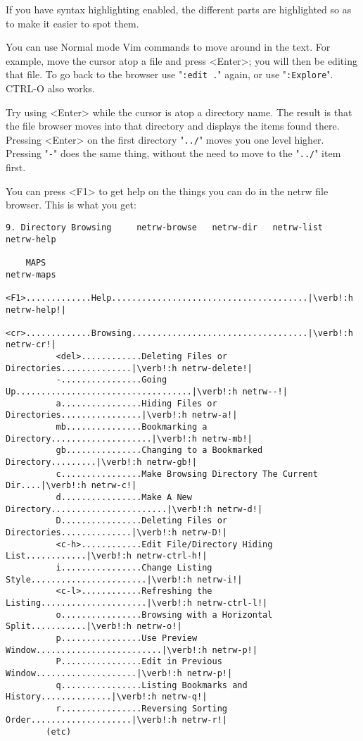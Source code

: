 If you have syntax highlighting enabled, the different parts are highlighted so as to make it easier to spot them.

You can use Normal mode Vim commands to move around in the text.
For example, move the cursor atop a file and press <Enter>; you will then be editing that file.
To go back to the browser use "\verb!:edit .!" again, or use "\verb!:Explore!".
CTRL-O also works.

Try using <Enter> while the cursor is atop a directory name.
The result is that the file browser moves into that directory and displays the items found there.
Pressing <Enter> on the first directory "\verb!../!" moves you one level higher.
Pressing "\verb!-!" does the same thing, without the need to move to the "\verb!../!" item first.

You can press <F1> to get help on the things you can do in the netrw file browser.
This is what you get:

\begin{Verbatim}[samepage=true]
    9. Directory Browsing     netrw-browse   netrw-dir   netrw-list   netrw-help 

    MAPS                                                                  netrw-maps 
          <F1>.............Help.......................................|\verb!:h netrw-help!|
          <cr>.............Browsing...................................|\verb!:h netrw-cr!|
          <del>............Deleting Files or Directories..............|\verb!:h netrw-delete!|
          -................Going Up...................................|\verb!:h netrw--!|
          a................Hiding Files or Directories................|\verb!:h netrw-a!|
          mb...............Bookmarking a Directory....................|\verb!:h netrw-mb!|
          gb...............Changing to a Bookmarked Directory.........|\verb!:h netrw-gb!|
          c................Make Browsing Directory The Current Dir....|\verb!:h netrw-c!|
          d................Make A New Directory.......................|\verb!:h netrw-d!|
          D................Deleting Files or Directories..............|\verb!:h netrw-D!|
          <c-h>............Edit File/Directory Hiding List............|\verb!:h netrw-ctrl-h!|
          i................Change Listing Style.......................|\verb!:h netrw-i!|
          <c-l>............Refreshing the Listing.....................|\verb!:h netrw-ctrl-l!|
          o................Browsing with a Horizontal Split...........|\verb!:h netrw-o!|
          p................Use Preview Window.........................|\verb!:h netrw-p!|
          P................Edit in Previous Window....................|\verb!:h netrw-p!|
          q................Listing Bookmarks and History..............|\verb!:h netrw-q!|
          r................Reversing Sorting Order....................|\verb!:h netrw-r!|
        (etc)
\end{Verbatim}

